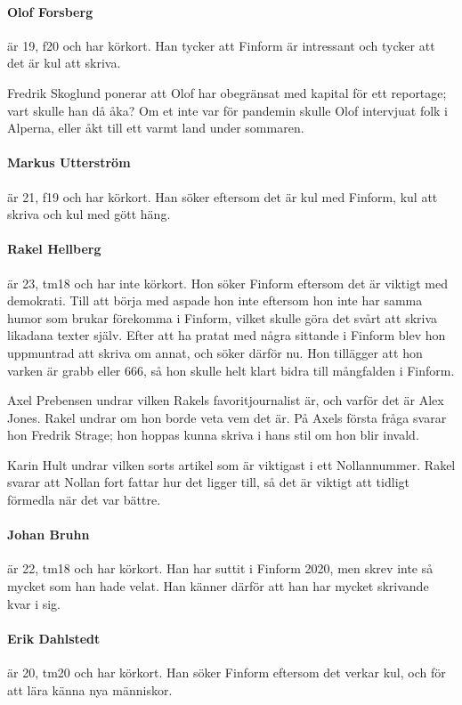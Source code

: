 \documentclass[hidelinks]{sektionsmote}
\begin{document}
\paragraph{Olof Forsberg} är 19, f20 och har körkort.
Han tycker att Finform är intressant och tycker att det är kul att skriva.

Fredrik Skoglund ponerar att Olof har obegränsat med kapital för ett reportage; vart skulle han då åka?
Om et inte var för pandemin skulle Olof intervjuat folk i Alperna, eller åkt till ett varmt land under sommaren.

\paragraph{Markus Utterström} är 21, f19 och har körkort.
Han söker eftersom det är kul med Finform, kul att skriva och kul med gött häng.

\paragraph{Rakel Hellberg} är 23, tm18 och har inte körkort.
Hon söker Finform eftersom det är viktigt med demokrati.
Till att börja med aspade hon inte eftersom hon inte har samma humor som brukar förekomma i Finform, vilket skulle göra det svårt att skriva likadana texter själv.
Efter att ha pratat med några sittande i Finform blev hon uppmuntrad att skriva om annat, och söker därför nu.
Hon tillägger att hon varken är grabb eller 666, så hon skulle helt klart bidra till mångfalden i Finform.

Axel Prebensen undrar vilken Rakels favoritjournalist är, och varför det är Alex Jones.
Rakel undrar om hon borde veta vem det är.
På Axels första fråga svarar hon Fredrik Strage; hon hoppas kunna skriva i hans stil om hon blir invald.

Karin Hult undrar vilken sorts artikel som är viktigast i ett Nollannummer.
Rakel svarar att Nollan fort fattar hur det ligger till, så det är viktigt att tidligt förmedla när det var bättre.

\paragraph{Johan Bruhn} är 22, tm18 och har körkort.
Han har suttit i Finform 2020, men skrev inte så mycket som han hade velat.
Han känner därför att han har mycket skrivande kvar i sig.

\paragraph{Erik Dahlstedt} är 20, tm20 och har körkort.
Han söker Finform eftersom det verkar kul, och för att lära känna nya människor.
\end{document}
